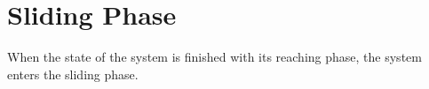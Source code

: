 \chapter{Sliding Phase}
When the state of the system is finished with its reaching phase, the system enters the sliding phase. 
